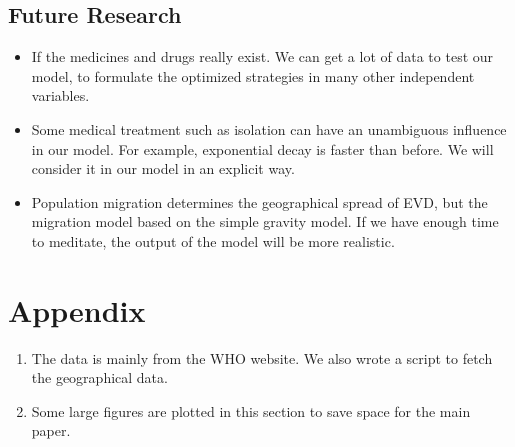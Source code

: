 \documentclass[11pt]{article}
\begin{document}
\subsection{Future Research}

\begin{itemize}

\item	If the medicines and drugs really exist. We can get a lot of data to test our model, to formulate the optimized strategies in many other independent variables.

\item	Some medical treatment such as isolation can have an unambiguous influence in our model. For example, exponential decay is faster than before. We will consider it in our model in an explicit way.

\item	Population migration determines the geographical spread of EVD, but the migration model based on the simple gravity model. If we have enough time to meditate, the output of the model will be more realistic.

\end{itemize}


\newpage




\newpage


\section*{Appendix}
\label{appendix}

\begin{enumerate}
\item The data is mainly from the WHO website. We also wrote a script to fetch the geographical data. 


\item Some large figures are plotted in this section to save space for the main paper.
\end{enumerate}
\end{document}

